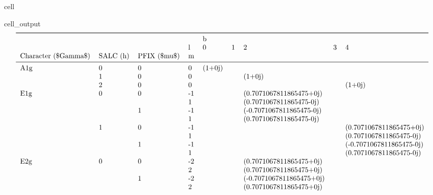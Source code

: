 \documentclass[letterpaper,table,10pt,english]{jupyterBook}
\begin{document}
\begin{sphinxuseclass}{cell}
\begin{sphinxVerbatimOutput}
\begin{sphinxuseclass}{cell_output}\begin{equation*}
\begin{split}\begin{tabular}{lllllllll}
\toprule
    &   &   & {} & \multicolumn{5}{l}{b} \\
    &   &   & l &       0 & 1 &                         2 & 3 &                         4 \\
Character (\$\textbackslash Gamma\$) & SALC (h) & PFIX (\$\textbackslash mu\$) & m &         &   &                           &   &                           \\
\midrule
A1g & 0 & 0 &  0 &  (1+0j) &   &                           &   &                           \\
    & 1 & 0 &  0 &         &   &                    (1+0j) &   &                           \\
    & 2 & 0 &  0 &         &   &                           &   &                    (1+0j) \\
E1g & 0 & 0 & -1 &         &   &   (0.7071067811865475+0j) &   &                           \\
    &   &   &  1 &         &   &   (0.7071067811865475-0j) &   &                           \\
    &   & 1 & -1 &         &   &  (-0.7071067811865475-0j) &   &                           \\
    &   &   &  1 &         &   &   (0.7071067811865475-0j) &   &                           \\
    & 1 & 0 & -1 &         &   &                           &   &   (0.7071067811865475+0j) \\
    &   &   &  1 &         &   &                           &   &   (0.7071067811865475-0j) \\
    &   & 1 & -1 &         &   &                           &   &  (-0.7071067811865475-0j) \\
    &   &   &  1 &         &   &                           &   &   (0.7071067811865475-0j) \\
E2g & 0 & 0 & -2 &         &   &   (0.7071067811865475+0j) &   &                           \\
    &   &   &  2 &         &   &   (0.7071067811865475+0j) &   &                           \\
    &   & 1 & -2 &         &   &  (-0.7071067811865475+0j) &   &                           \\
    &   &   &  2 &         &   &   (0.7071067811865475+0j) &   &                           \\

\end{tabular}
\end{split}
\end{equation*}
\end{sphinxuseclass}
\end{sphinxVerbatimOutput}
\end{sphinxuseclass}
\end{document}
